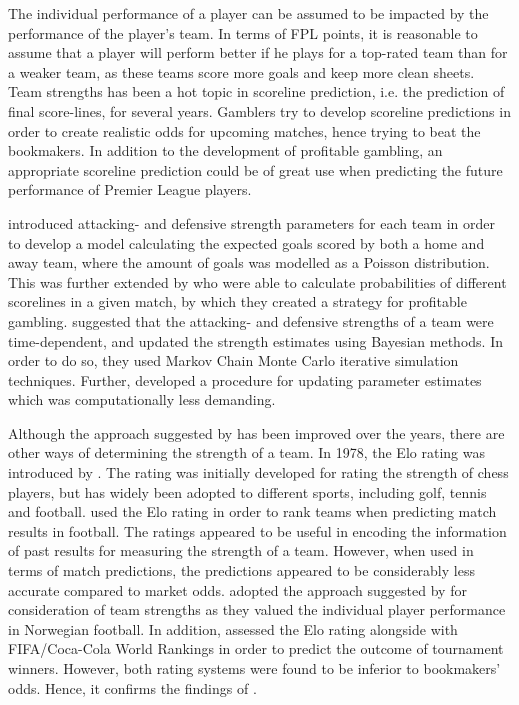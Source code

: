 The individual performance of a player can be assumed to be impacted by the performance of the player's team. In terms of FPL points, it is reasonable to assume that a player will perform better if he plays for a top-rated team than for a weaker team, as these teams score more goals and keep more clean sheets. Team strengths has been a hot topic in scoreline prediction, i.e. the prediction of final score-lines, for several years. Gamblers try to develop scoreline predictions in order to create realistic odds for upcoming matches, hence trying to beat the bookmakers. In addition to the development of profitable gambling, an appropriate scoreline prediction could be of great use when predicting the future performance of Premier League players. 


\newpar

\cite{Maher} introduced attacking- and defensive strength parameters for each team in order to develop a model calculating the expected goals scored by both a home and away team, where the amount of goals was modelled as a Poisson distribution. This was further extended by \cite{Dixon} who were able to calculate probabilities of different scorelines in a given match, by which they created a strategy for profitable gambling. \cite{Rue} suggested that the attacking- and defensive strengths of a team were time-dependent, and updated the strength estimates using Bayesian methods. In order to do so, they used Markov Chain Monte Carlo iterative simulation techniques. Further, \cite{Crowder} developed a procedure for updating parameter estimates which was computationally less demanding.



\newpar

Although the approach suggested by \cite{Maher} has been improved over the years, there are other ways of determining the strength of a team. In 1978, the Elo rating was introduced by \cite{Elo}. The rating was initially developed for rating the strength of chess players, but has widely been adopted to different sports, including golf, tennis and football. \cite{Hvattum} used the Elo rating in order to rank teams when predicting match results in football. The ratings appeared to be useful in encoding the information of past results for measuring the strength of a team. However, when used in terms of match predictions, the predictions appeared to be considerably less accurate compared to market odds. \cite{vabo} adopted the approach suggested by \cite{Hvattum} for consideration of team strengths as they valued the individual player performance in Norwegian football. In addition, \cite{Leitner} assessed the Elo rating alongside with FIFA/Coca-Cola World Rankings \citep{FIFA} in order to predict the outcome of tournament winners. However, both rating systems were found to be inferior to bookmakers' odds. Hence, it confirms the findings of \cite{Hvattum}. 

